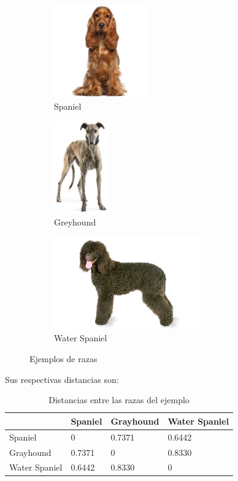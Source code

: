 \documentclass[12,twoside]{TFG-GM}
\theoremstyle{definition}
\theoremstyle{remark}
\begin{document}
\begin{figure}[H] 
	\centering
	\begin{subfigure}[b]{0.3\textwidth}
		\includegraphics[height=4cm] {Images/examples/spaniel.jpg}
		\caption{Spaniel \label{fig:spaniel}}
	\end{subfigure}
	\begin{subfigure}[b]{0.3\textwidth}
		\centering
		\includegraphics[height=4cm]  {Images/examples/greyhound.jpg}
		\caption{Greyhound \label{fig:greyhound}}
	\end{subfigure}
	\begin{subfigure}[b]{0.3\textwidth}
		\includegraphics[height=4cm]{Images/examples/waterspaniel.jpg}
		\caption{Water Spaniel\label{fig:waterspaniel}}
	\end{subfigure}       
	\caption{Ejemplos de razas\label{fig:dogexample}}
\end{figure}

Sus respectivas distancias son: 

\begin{table}[H]
\centering
\caption{Distancias entre las razas del ejemplo}
\label{tabledogs}
\begin{tabular}{l|l|l|l}
              & Spaniel & Grayhound & Water Spaniel               \\ \hline
Spaniel       & 0       & 0.7371    & \multicolumn{1}{l|}{0.6442} \\ \hline
Grayhound     & 0.7371  & 0         & \multicolumn{1}{l|}{0.8330} \\ \hline
Water Spaniel & 0.6442  & 0.8330    & \multicolumn{1}{l|}{0}      \\ \cline{2-4} 
\end{tabular}
\end{table}
\end{document}
